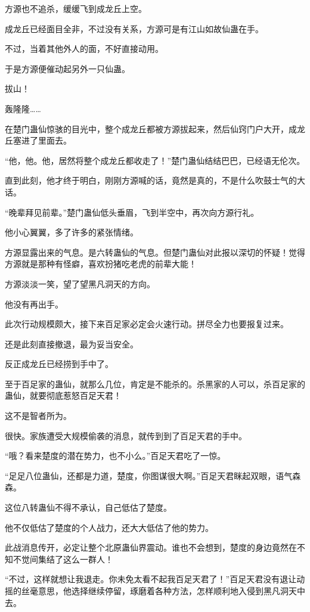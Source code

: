 \begin{this_body}
方源也不追杀，缓缓飞到成龙丘上空。

成龙丘已经面目全非，不过没有关系，方源可是有江山如故仙蛊在手。

不过，当着其他外人的面，不好直接动用。

于是方源便催动起另外一只仙蛊。

拔山！

轰隆隆……

在楚门蛊仙惊骇的目光中，整个成龙丘都被方源拔起来，然后仙窍门户大开，成龙丘塞进了里面去。

“他，他。他，居然将整个成龙丘都收走了！”楚门蛊仙结结巴巴，已经语无伦次。

直到此刻，他才终于明白，刚刚方源喊的话，竟然是真的，不是什么吹鼓士气的大话。

“晚辈拜见前辈。”楚门蛊仙低头垂眉，飞到半空中，再次向方源行礼。

他小心翼翼，多了许多的紧张情绪。

方源显露出来的气息。是六转蛊仙的气息。但楚门蛊仙对此报以深切的怀疑！觉得方源就是那种有怪癖，喜欢扮猪吃老虎的前辈大能！

方源淡淡一笑，望了望黑凡洞天的方向。

他没有再出手。

此次行动规模颇大，接下来百足家必定会火速行动。拼尽全力也要报复过来。

还是此刻直接撤退，最为妥当安全。

反正成龙丘已经捞到手中了。

至于百足家的蛊仙，就那么几位，肯定是不能杀的。杀黑家的人可以，杀百足家的蛊仙，就要彻底惹怒百足天君！

这不是智者所为。

很快。家族遭受大规模偷袭的消息，就传到到了百足天君的手中。

“哦？看来楚度的潜在势力，也不小么。”百足天君吃了一惊。

“足足八位蛊仙，还都是力道，楚度，你图谋很大啊。”百足天君眯起双眼，语气森森。

这位八转蛊仙不得不承认，自己低估了楚度。

他不仅低估了楚度的个人战力，还大大低估了他的势力。

此战消息传开，必定让整个北原蛊仙界震动。谁也不会想到，楚度的身边竟然在不知不觉间集结了这么一群人！

“不过，这样就想让我退走。你未免太看不起我百足天君了！”百足天君没有退让动摇的丝毫意思，他选择继续停留，琢磨着各种方法，怎样顺利地入侵到黑凡洞天中去。


\end{this_body}
